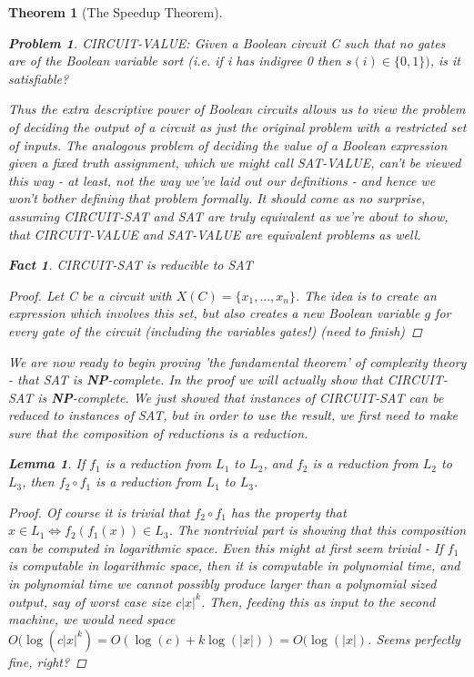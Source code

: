 \documentclass{article}
\theoremstyle{definition}
\newtheorem{problem}{Problem}
\theoremstyle{plain}
\theoremstyle{theorem}
\newtheorem{fact}{Fact}[section]
\newtheorem{lemma}{Lemma}[section]
\newtheorem{theorem}{Theorem}[section]
\begin{document}
\begin{theorem}[The Speedup Theorem]
\begin{problem}
    CIRCUIT-VALUE: Given a Boolean circuit C \textit{such that no gates are of the Boolean variable sort} (i.e. if i has indigree 0 then $s(i) \in \{0,1\})$, is it satisfiable?
\end{problem}
Thus the extra descriptive power of Boolean circuits allows us to view the problem of \textit{deciding the output of a circuit} as just the original problem with a restricted set of inputs. The analogous problem of deciding the value of a Boolean expression given a fixed truth assignment, which we might call SAT-VALUE, can't be viewed this way - at least, not the way we've laid out our definitions - and hence we won't bother defining that problem formally. It should come as no surprise, assuming CIRCUIT-SAT and SAT are truly equivalent as we're about to show, that CIRCUIT-VALUE and SAT-VALUE are equivalent problems as well.
\begin{fact}
    CIRCUIT-SAT is reducible to SAT
\end{fact}
\begin{proof}
    Let C be a circuit with $X(C) = \{x_1,...,x_n\}$. The idea is to create an expression which involves this set, but also creates a new Boolean variable $g$ for every gate of the circuit (including the variables gates!)  (need to finish)
\end{proof}
We are now ready to begin proving 'the fundamental theorem' of complexity theory - that SAT is \textbf{NP}-complete. In the proof we will actually show that CIRCUIT-SAT is \textbf{NP}-complete. We just showed that instances of CIRCUIT-SAT can be reduced to instances of SAT, but in order to use the result, we first need to make sure that the composition of reductions is a reduction.
\begin{lemma}
    If $f_1$ is a reduction from $L_1$ to $L_2$, and $f_2$ is a reduction from $L_2$ to $L_3$, then $f_2 \circ f_1$ is a reduction from $L_1$ to $L_3$. 
\end{lemma}
\begin{proof}
    Of course it is trivial that $f_2 \circ f_1$ has the property that $x \in L_1 \iff f_2(f_1(x)) \in L_3$. The nontrivial part is showing that this composition can be computed in logarithmic space. Even this might at first seem trivial - If $f_1$ is computable in logarithmic space, then it is computable in polynomial time, and in polynomial time we cannot possibly produce larger than a polynomial sized output, say of worst case size $c|x|^k$. Then, feeding this as input to the second machine, we would need space $O(\log(c|x|^k)=O(\log(c)+k\log(|x|))=O(\log(|x|)$. Seems perfectly fine, right?

\end{proof}
\end{theorem}
\end{document}
